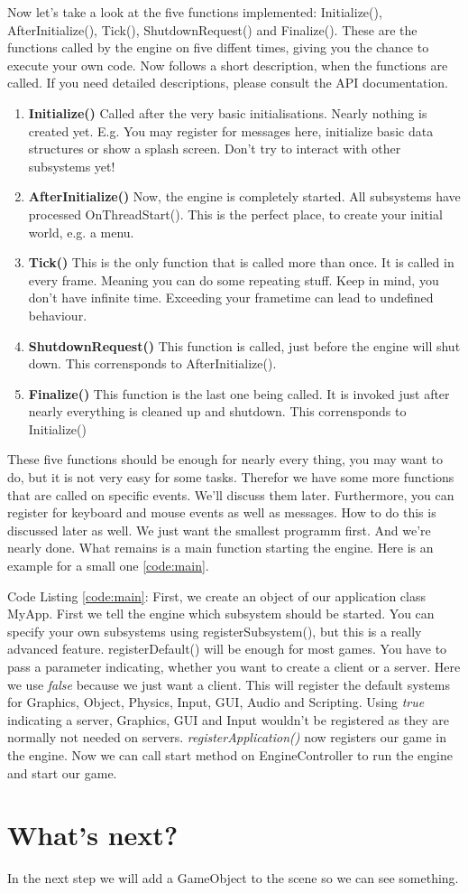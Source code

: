 \documentclass{article}
\begin{document}

Now let's take a look at the five functions implemented: Initialize(), AfterInitialize(), Tick(), ShutdownRequest() and Finalize(). These are the functions called by the engine on five diffent times, giving you the chance to execute your own code. Now follows a short description, when the functions are called. If you need detailed descriptions, please consult the API documentation.
\begin{enumerate}
	\item \textbf{Initialize()} Called after the very basic initialisations. Nearly nothing is created yet. E.g. You may register for messages here, initialize basic data structures or show a splash screen. Don't try to interact with other subsystems yet!
	\item \textbf{AfterInitialize()} Now, the engine is completely started. All subsystems have processed OnThreadStart(). This is the perfect place, to create your initial world, e.g. a menu.
	\item \textbf{Tick()} This is the only function that is called more than once. It is called in every frame. Meaning you can do some repeating stuff. Keep in mind, you don't have infinite time. Exceeding your frametime can lead to undefined behaviour.
	\item \textbf{ShutdownRequest()} This function is called, just before the engine will shut down. This corrensponds to AfterInitialize().
	\item \textbf{Finalize()} This function is the last one being called. It is invoked just after nearly everything is cleaned up and shutdown. This corrensponds to Initialize()
\end{enumerate}
These five functions should be enough for nearly every thing, you may want to do, but it is not very easy for some tasks. Therefor we have some more functions that are called on specific events. We'll discuss them later. Furthermore, you can register for keyboard and mouse events as well as messages. How to do this is discussed later as well. We just want the smallest programm first. And we're nearly done. What remains is a main function starting the engine. Here is an example for a small one \ref{code:main}.

Code Listing \ref{code:main}: First, we create an object of our application class MyApp. First we tell the engine which subsystem should be started. You can specify your own subsystems using registerSubsystem(), but this is a really advanced feature. registerDefault() will be enough for most games. You have to pass a parameter indicating, whether you want to create a client or a server. Here we use \textit{false} because we just want a client. This will register the default systems for Graphics, Object, Physics, Input, GUI, Audio and Scripting. Using \textit{true} indicating a server, Graphics, GUI and Input wouldn't be registered as they are normally not needed on servers. \textit{registerApplication()} now registers our game in the engine. Now we can call start method on EngineController to run the engine and start our game.

\section{What's next?}

In the next step we will add a GameObject to the scene so we can see something.
\end{document}
